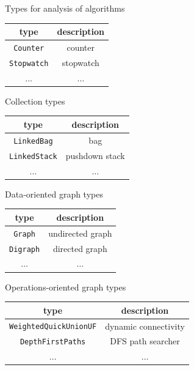 \documentclass[8pt,a4paper,compress]{beamer}
\begin{document}
\begin{frame}[fragile]
Types for analysis of algorithms
\begin{center}
\begin{tabular}{cc}
type & description \\ \hline
\lstinline$Counter$ &  counter \\
\lstinline$Stopwatch$ & stopwatch \\
$\dots$ & $\dots$
\end{tabular} 
\end{center}

Collection types
\begin{center}
\begin{tabular}{cc}
type & description \\ \hline
\lstinline$LinkedBag$ & bag \\
\lstinline$LinkedStack$ & pushdown stack \\
$\dots$ & $\dots$
\end{tabular} 
\end{center}

Data-oriented graph types
\begin{center}
\begin{tabular}{cc}
type & description \\ \hline
\lstinline$Graph$  & undirected graph \\
\lstinline$Digraph$ & directed graph \\
$\dots$ & $\dots$
\end{tabular} 
\end{center}

Operations-oriented graph types
\begin{center}
\begin{tabular}{cc}
type & description \\ \hline
\lstinline$WeightedQuickUnionUF$ & dynamic connectivity \\
\lstinline$DepthFirstPaths$ & DFS path searcher \\
$\dots$ & $\dots$
\end{tabular} 
\end{center}
\end{frame}
\end{document}

